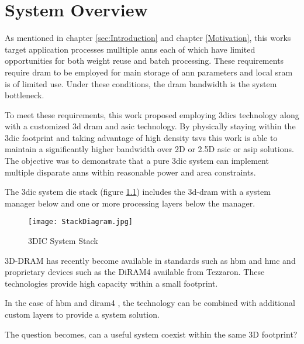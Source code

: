 



\chapter{System Overview}
\label{chap-five}
\label{sec:System Overview}
As mentioned in chapter \ref{sec:Introduction} and chapter \ref{Motivation}, this works target application processes mulltiple \acp{ann} each of which have limited opportunities for both weight reuse and batch processing.
These requirements require \ac{dram} to be employed for main storage of \ac{ann} parameters and local \ac{sram} is of limited use.
Under these conditions, the \ac{dram} bandwidth is the system bottleneck.

To meet these requirements, this work proposed employing \acp{3dic} technology along with a customized \ac{3d} \ac{dram} and \ac{asic} technology. 
By physically staying within the \ac{3dic} footprint and taking advantage of high density \acp{tsv} this work is able to maintain a significantly higher bandwidth over 2D or 2.5D \ac{asic} or \ac{asip} solutions.
The objective was to demonstrate that a pure \ac{3dic} system can implement multiple disparate \acp{ann} within reasonable power and area constraints. 

The \ac{3dic} system die stack (figure \ref{fig:3DICStack}) includes the \ac{3d}-\ac{dram} with a system manager below and one or more processing layers below the manager.
\begin{figure}[!t]
\centering
\captionsetup{justification=centering}
\captionsetup{width=.9\linewidth}
\centerline{
\mbox{\texttt{[image: StackDiagram.jpg]}}
}
\caption{3DIC System Stack}
\label{fig:3DICStack}
\end{figure}

3D-DRAM has recently become available in standards such as \ac{hbm} and \ac{hmc} and proprietary devices such as the DiRAM4 available from Tezzaron. 
These technologies provide high capacity within a small footprint.

In the case of \ac{hbm} and \ac{diram4} \cite{tezzaron:diram4}, the technology can be combined with additional custom layers to provide a system solution.

The question becomes, can a useful system coexist within the same 3D footprint?

